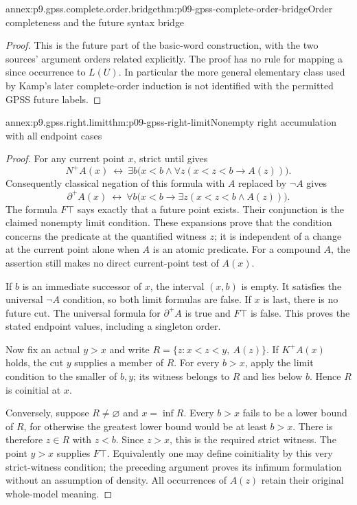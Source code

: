 \begin{annexitem}{annex:p9.gpss.complete.order.bridge}{thm:p09-gpss-complete-order-bridge}{Order completeness and the future syntax bridge}
\begin{proof}
This is the future part of the basic-word construction, with the two
sources' argument orders related explicitly. The proof has no rule
for mapping a since occurrence to \(L(U)\). In particular the
more general elementary class used by Kamp's later complete-order
induction is not identified with the permitted GPSS future labels.
\end{proof}
\end{annexitem}

\begin{annexitem}{annex:p9.gpss.right.limit}{thm:p09-gpss-right-limit}{Nonempty right accumulation with all endpoint cases}
\begin{proof}
For any current point \(x\), strict until gives
\[
 N^+A(x)\ \longleftrightarrow\
        \exists b\bigl(x<b\land
                    \forall z(x<z<b\to A(z))\bigr).
\]
Consequently classical negation of this formula with \(A\) replaced
by \(\neg A\) gives
\[
 \partial^+A(x)\ \longleftrightarrow\
        \forall b\bigl(x<b\to
                    \exists z(x<z<b\land A(z))\bigr).
\]
The formula \(F\top\) says exactly that a future point exists.
Their conjunction is the claimed nonempty limit condition.
These expansions prove that the condition concerns the predicate
at the quantified witness \(z\); it is independent of a change
at the current point alone when \(A\) is an atomic predicate.
For a compound \(A\), the assertion still makes no direct
current-point test of \(A(x)\).

If \(b\) is an immediate successor of \(x\), the interval
\((x,b)\) is empty. It satisfies the universal \(\neg A\)
condition, so both limit formulas are false. If \(x\) is last,
there is no future cut. The universal formula for \(\partial^+A\)
is true and \(F\top\) is false. This proves the stated endpoint
values, including a singleton order.

Now fix an actual \(y>x\) and write
\(R=\{z:x<z<y,\ A(z)\}\). If \(K^+A(x)\) holds,
the cut \(y\) supplies a member of \(R\). For every \(b>x\),
apply the limit condition to the smaller of \(b,y\); its witness
belongs to \(R\) and lies below \(b\). Hence \(R\) is
coinitial at \(x\).

Conversely, suppose \(R\ne\varnothing\) and \(x=\inf R\).
Every \(b>x\) fails to be a lower bound of \(R\), for otherwise
the greatest lower bound would be at least \(b>x\). There is
therefore \(z\in R\) with \(z<b\). Since \(z>x\), this is the
required strict witness. The point \(y>x\) supplies \(F\top\).
Equivalently one may define coinitiality by this very strict-witness
condition; the preceding argument proves its infimum formulation
without an assumption of density. All occurrences of \(A(z)\)
retain their original whole-model meaning.
\end{proof}
\end{annexitem}

